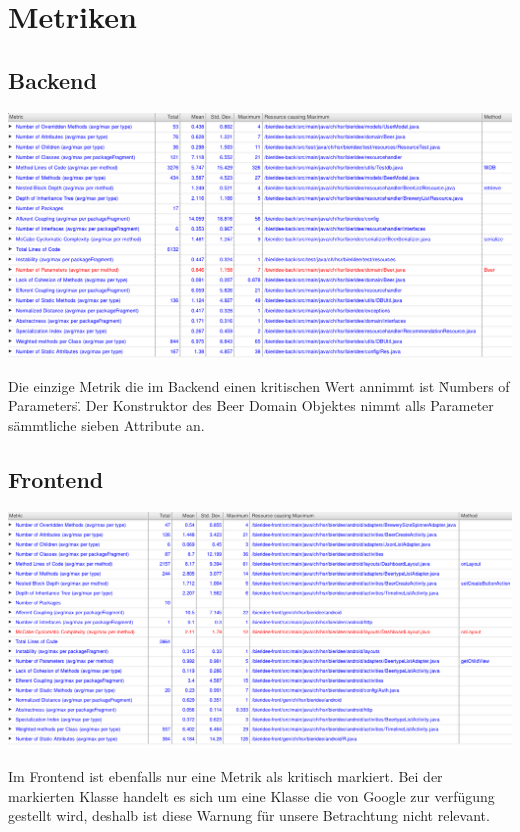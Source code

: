 \documentclass[10pt,a4paper]{scrartcl}
\begin{document}
\section{Metriken}
\subsection{Backend}
\includegraphics[scale=0.4, angle=90]{metrics-back.png}

Die einzige Metrik die im Backend einen kritischen Wert annimmt ist \"Numbers of Parameters\". Der Konstruktor des Beer Domain Objektes nimmt alls Parameter sämmtliche sieben Attribute an.
\newpage
\subsection{Frontend}
\includegraphics[scale=0.4, angle=90]{metrics-front.png}

Im Frontend ist ebenfalls nur eine Metrik als kritisch markiert. Bei der markierten Klasse handelt es sich um eine Klasse die von Google zur verfügung gestellt wird, deshalb ist diese Warnung für unsere Betrachtung nicht relevant.
\end{document}
